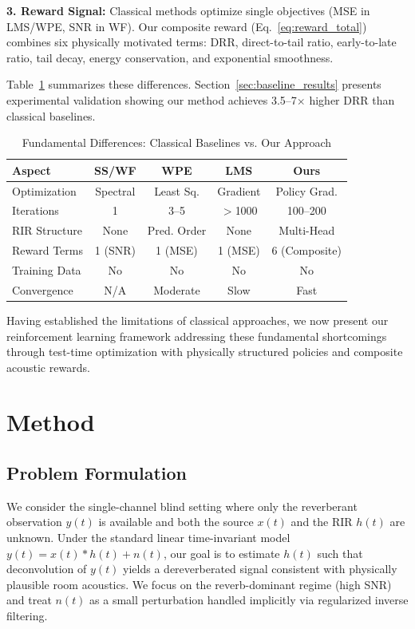 \documentclass[12pt,a4paper]{article}
\begin{document}
\textbf{3. Reward Signal:} Classical methods optimize single objectives (MSE in LMS/WPE, SNR in WF). Our composite reward (Eq.~\ref{eq:reward_total}) combines six physically motivated terms: DRR, direct-to-tail ratio, early-to-late ratio, tail decay, energy conservation, and exponential smoothness.

Table~\ref{tab:method_comparison} summarizes these differences. Section~\ref{sec:baseline_results} presents experimental validation showing our method achieves 3.5--7$\times$ higher DRR than classical baselines.

\begin{table}[t]
\centering
\caption{Fundamental Differences: Classical Baselines vs. Our Approach}
\label{tab:method_comparison}
\small
\begin{tabular}{@{}lcccc@{}}
\toprule
\textbf{Aspect} & \textbf{SS/WF} & \textbf{WPE} & \textbf{LMS} & \textbf{Ours} \\
\midrule
Optimization & Spectral & Least Sq. & Gradient & Policy Grad. \\
Iterations & 1 & 3--5 & $>$1000 & 100--200 \\
RIR Structure & None & Pred. Order & None & Multi-Head \\
Reward Terms & 1 (SNR) & 1 (MSE) & 1 (MSE) & 6 (Composite) \\
Training Data & No & No & No & No \\
Convergence & N/A & Moderate & Slow & Fast \\
\bottomrule
\end{tabular}
\end{table}

Having established the limitations of classical approaches, we now present our reinforcement learning framework addressing these fundamental shortcomings through test-time optimization with physically structured policies and composite acoustic rewards.

\section{Method}

\subsection{Problem Formulation}

We consider the single-channel blind setting where only the reverberant observation $y(t)$ is available and both the source $x(t)$ and the RIR $h(t)$ are unknown. Under the standard linear time-invariant model $y(t) = x(t) * h(t) + n(t)$, our goal is to estimate $h(t)$ such that deconvolution of $y(t)$ yields a dereverberated signal consistent with physically plausible room acoustics. We focus on the reverb-dominant regime (high SNR) and treat $n(t)$ as a small perturbation handled implicitly via regularized inverse filtering.
\end{document}
